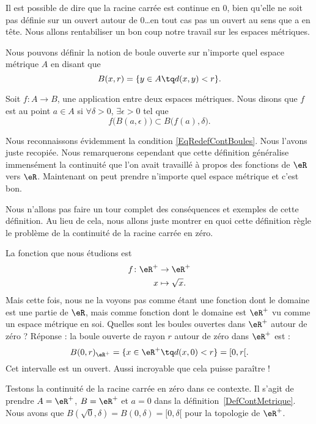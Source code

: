 Il est possible de dire que la racine carrée est continue en \( 0\), bien qu'elle ne soit pas définie sur un ouvert autour de \( 0\)\ldots en tout cas pas un ouvert au sens que  a en tête. Nous allons rentabiliser un bon coup notre travail sur les espaces métriques.

Nous pouvons définir la notion de boule ouverte sur n'importe quel espace métrique \( A\) en disant que
\[
	B(x,r)=\{ y\in A\tq d(x,y)<r \}.
\]
\begin{definition}      \label{DefContMetrique}
	Soit \( f\colon A\to B\), une application entre deux espaces métriques. Nous disons que \( f\) est  au point \( a\in A\) si \( \forall \delta>0\), \( \exists\epsilon>0\) tel que
	\begin{equation}
		f\big( B(a,\epsilon) \big)\subset B\big( f(a),\delta \big).
	\end{equation}
\end{definition}
Nous reconnaissons évidemment la condition \eqref{EqRedefContBoules}. Nous l'avons juste recopiée. Nous remarquerons cependant que cette définition généralise immensément la continuité que l'on avait travaillé à propos des fonctions de \( \eR\) vers \( \eR\). Maintenant on peut prendre n'importe quel espace métrique et c'est bon.

Nous n'allons pas faire un tour complet des conséquences et exemples de cette définition. Au lieu de cela, nous allons juste montrer en quoi cette définition règle le problème de la continuité de la racine carrée en zéro.

La fonction que nous étudions est
\begin{equation}
	\begin{aligned}
		f \colon \eR^+ & \to \eR^+         \\
		x              & \mapsto \sqrt{x}.
	\end{aligned}
\end{equation}
Mais cette fois, nous ne la voyons pas comme étant une fonction dont le domaine est une partie de \( \eR\), mais comme fonction dont le domaine est \( \eR^+\) vu comme un espace métrique en soi. Quelles sont les boules ouvertes dans \( \eR^+\) autour de zéro ? Réponse : la boule ouverte de rayon \( r\) autour de zéro dans \( \eR^+\) est :
\[
	B(0,r)_{\eR^+}=\{ x\in\eR^+\tq d(x,0)<r \}=[0,r[.
\]
Cet intervalle est un ouvert. Aussi incroyable que cela puisse paraître !

Testons la continuité de la racine carrée en zéro dans ce contexte. Il s'agit de prendre \( A=\eR^+\), \( B=\eR^+\) et \( a=0\) dans la définition~\ref{DefContMetrique}. Nous avons que \( B(\sqrt{0},\delta)=B(0,\delta)=[0,\delta[\) pour la topologie de \( \eR^+\).

